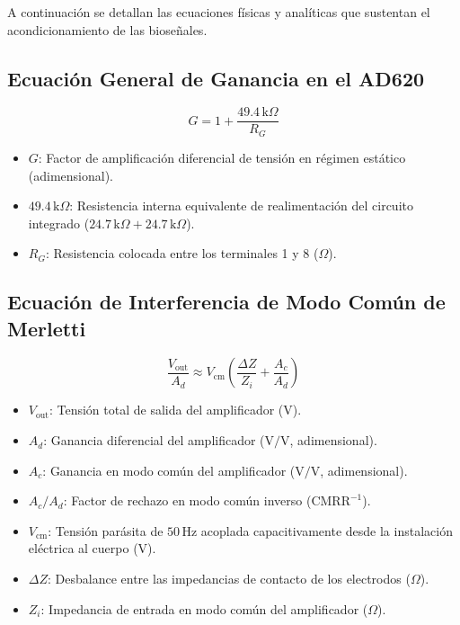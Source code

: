 \documentclass[11pt,a4paper]{article}
\begin{document}
A continuación se detallan las ecuaciones físicas y analíticas que sustentan el acondicionamiento de las bioseñales.

\subsection{Ecuación General de Ganancia en el AD620}
\begin{equation}
G = 1 + \frac{49.4\,\text{k}\Omega}{R_G}
\end{equation}
\begin{itemize}
    \item $G$: Factor de amplificación diferencial de tensión en régimen estático (adimensional).
    \item $49.4\,\text{k}\Omega$: Resistencia interna equivalente de realimentación del circuito integrado ($24.7\,\text{k}\Omega + 24.7\,\text{k}\Omega$).
    \item $R_G$: Resistencia colocada entre los terminales 1 y 8 ($\Omega$).
\end{itemize}

\subsection{Ecuación de Interferencia de Modo Común de Merletti}
\begin{equation}
\frac{V_{\text{out}}}{A_d} \approx V_{\text{cm}} \left( \frac{\Delta Z}{Z_i} + \frac{A_c}{A_d} \right)
\end{equation}
\begin{itemize}
    \item $V_{\text{out}}$: Tensión total de salida del amplificador ($\text{V}$).
    \item $A_d$: Ganancia diferencial del amplificador ($\text{V/V}$, adimensional).
    \item $A_c$: Ganancia en modo común del amplificador ($\text{V/V}$, adimensional).
    \item $A_c / A_d$: Factor de rechazo en modo común inverso ($\text{CMRR}^{-1}$).
    \item $V_{\text{cm}}$: Tensión parásita de $50\,\text{Hz}$ acoplada capacitivamente desde la instalación eléctrica al cuerpo ($\text{V}$).
    \item $\Delta Z$: Desbalance entre las impedancias de contacto de los electrodos ($\Omega$).
    \item $Z_i$: Impedancia de entrada en modo común del amplificador ($\Omega$).
\end{itemize}
\end{document}
